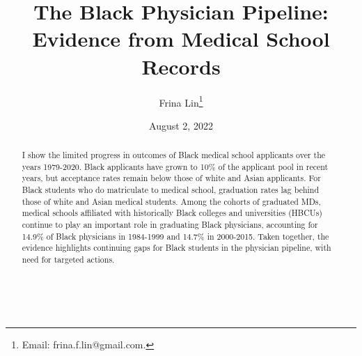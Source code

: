\documentclass[12pt]{article}
\begin{document}
\begin{titlepage}
\title{The Black Physician Pipeline: \\ Evidence from Medical School Records}
\author{Frina Lin\thanks{Email: frina.f.lin@gmail.com. }}
\date{August 2, 2022}
\maketitle
\begin{abstract} 

   I show the limited progress in outcomes of Black medical school applicants over the years 1979-2020. Black applicants have grown to 10\% of the applicant pool in recent years, but acceptance rates remain below those of white and Asian applicants. For Black students who do matriculate to medical school, graduation rates lag behind those of white and Asian medical students. Among the cohorts of graduated MDs, medical schools affiliated with historically Black colleges and universities (HBCUs) continue to play an important role in graduating Black physicians, accounting for 14.9\% of Black physicians in 1984-1999 and 14.7\% in 2000-2015. Taken together, the evidence highlights continuing gaps for Black students in the physician pipeline, with need for targeted actions.
\\
\vspace{0in}\\
\vspace{0in}\\

\bigskip
\end{abstract}
\setcounter{page}{0}
\thispagestyle{empty}
\end{titlepage}
\pagebreak \newpage
\end{document}
